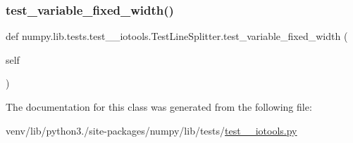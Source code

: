\subsubsection{\texorpdfstring{test\+\_\+variable\+\_\+fixed\+\_\+width()}{test\_variable\_fixed\_width()}}
{\footnotesize\ttfamily def numpy.\+lib.\+tests.\+test\+\_\+\+\_\+iotools.\+Test\+Line\+Splitter.\+test\+\_\+variable\+\_\+fixed\+\_\+width (\begin{DoxyParamCaption}\item[{}]{self }\end{DoxyParamCaption})}



The documentation for this class was generated from the following file\+:\begin{DoxyCompactItemize}
\item 
venv/lib/python3./site-\/packages/numpy/lib/tests/\hyperlink{test____iotools_8py}{test\+\_\+\+\_\+iotools.\+py}\end{DoxyCompactItemize}

